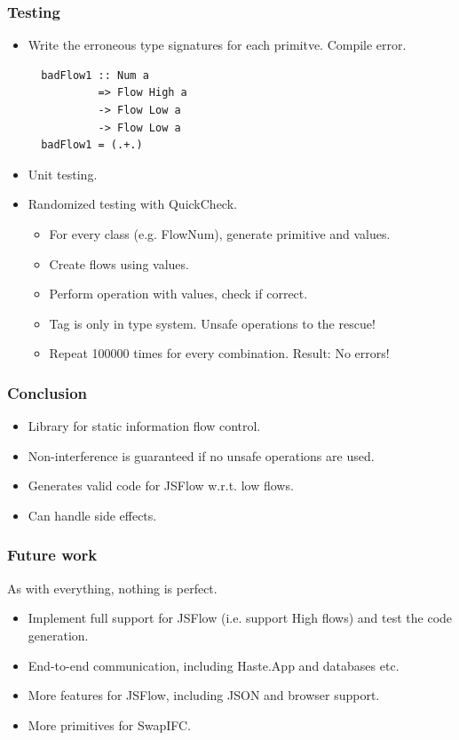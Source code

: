 \documentclass{beamer}
\begin{document}
\begin{frame}[fragile]
  \frametitle{Testing}
  \begin{itemize}
    \item Write the erroneous type signatures for each primitve. Compile error. \pause
\begin{verbatim}
  badFlow1 :: Num a
           => Flow High a
           -> Flow Low a
           -> Flow Low a
  badFlow1 = (.+.)
\end{verbatim}
\pause
    \item Unit testing. \pause
    \item Randomized testing with QuickCheck. \pause
      \begin{itemize}
        \item For every class (e.g. FlowNum), generate primitive and values. \pause
        \item Create flows using values. \pause
        \item Perform operation with values, check if correct. \pause
        \item Tag is only in type system. \pause Unsafe operations to the rescue! \pause
        \item Repeat 100000 times for every combination. \pause Result: No errors!
      \end{itemize}
  \end{itemize}
\end{frame}


\begin{frame}
  \frametitle{Conclusion}
  \begin{itemize}
    \item Library for static information flow control. \pause
    \item Non-interference is guaranteed if no unsafe operations are used. \pause
    \item Generates valid code for JSFlow w.r.t. low flows. \pause
    \item Can handle side effects.
  \end{itemize}
\end{frame}


\begin{frame}
  \frametitle{Future work}
  As with everything, nothing is perfect. \pause
  \begin{itemize}
    \item Implement full support for JSFlow (i.e. support High flows) and test the code generation. \pause
    \item End-to-end communication, including Haste.App and databases etc. \pause
    \item More features for JSFlow, including JSON and browser support. \pause
    \item More primitives for SwapIFC.
  \end{itemize}
\end{frame}
\end{document}
